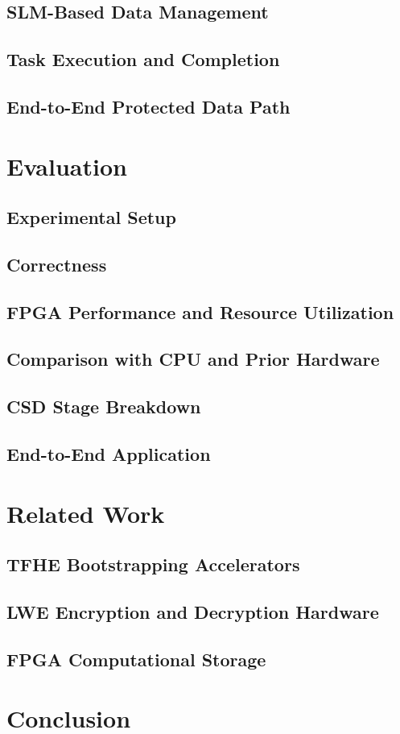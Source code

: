 \documentclass[sigconf,anonymous]{acmart}
\begin{document}
\subsection{SLM-Based Data Management}

\subsection{Task Execution and Completion}

\subsection{End-to-End Protected Data Path}

\section{Evaluation}

\subsection{Experimental Setup}

\subsection{Correctness}

\subsection{FPGA Performance and Resource Utilization}

\subsection{Comparison with CPU and Prior Hardware}

\subsection{CSD Stage Breakdown}

\subsection{End-to-End Application}

\section{Related Work}

\subsection{TFHE Bootstrapping Accelerators}

\subsection{LWE Encryption and Decryption Hardware}

\subsection{FPGA Computational Storage}

\section{Conclusion}



\end{document}
